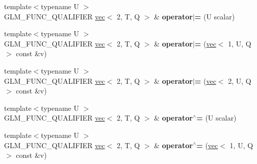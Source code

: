 \begin{DoxyCompactItemize}
\item 
\mbox{\label{structglm_1_1vec_3_012_00_01T_00_01Q_01_4_acc0ff197f7484a80cfb27a71365d9756}} 
{\footnotesize template$<$typename U $>$ }\\G\+L\+M\+\_\+\+F\+U\+N\+C\+\_\+\+Q\+U\+A\+L\+I\+F\+I\+ER \hyperlink{structglm_1_1vec}{vec}$<$ 2, T, Q $>$ \& {\bfseries operator$\vert$=} (U scalar)
\item 
\mbox{\label{structglm_1_1vec_3_012_00_01T_00_01Q_01_4_ae4060ed77226e8669a00d6511f61eab3}} 
{\footnotesize template$<$typename U $>$ }\\G\+L\+M\+\_\+\+F\+U\+N\+C\+\_\+\+Q\+U\+A\+L\+I\+F\+I\+ER \hyperlink{structglm_1_1vec}{vec}$<$ 2, T, Q $>$ \& {\bfseries operator$\vert$=} (\hyperlink{structglm_1_1vec}{vec}$<$ 1, U, Q $>$ const \&v)
\item 
\mbox{\label{structglm_1_1vec_3_012_00_01T_00_01Q_01_4_a7c1e10ca06c86243f4ad6ceb094e7bdc}} 
{\footnotesize template$<$typename U $>$ }\\G\+L\+M\+\_\+\+F\+U\+N\+C\+\_\+\+Q\+U\+A\+L\+I\+F\+I\+ER \hyperlink{structglm_1_1vec}{vec}$<$ 2, T, Q $>$ \& {\bfseries operator$\vert$=} (\hyperlink{structglm_1_1vec}{vec}$<$ 2, U, Q $>$ const \&v)
\item 
\mbox{\label{structglm_1_1vec_3_012_00_01T_00_01Q_01_4_a001454ab3038753bcf6550210eee8e59}} 
{\footnotesize template$<$typename U $>$ }\\G\+L\+M\+\_\+\+F\+U\+N\+C\+\_\+\+Q\+U\+A\+L\+I\+F\+I\+ER \hyperlink{structglm_1_1vec}{vec}$<$ 2, T, Q $>$ \& {\bfseries operator$^\wedge$=} (U scalar)
\item 
\mbox{\label{structglm_1_1vec_3_012_00_01T_00_01Q_01_4_a430b0e95cce94009cb9822a7b8a08f89}} 
{\footnotesize template$<$typename U $>$ }\\G\+L\+M\+\_\+\+F\+U\+N\+C\+\_\+\+Q\+U\+A\+L\+I\+F\+I\+ER \hyperlink{structglm_1_1vec}{vec}$<$ 2, T, Q $>$ \& {\bfseries operator$^\wedge$=} (\hyperlink{structglm_1_1vec}{vec}$<$ 1, U, Q $>$ const \&v)
\item 
\mbox{\label{structglm_1_1vec_3_012_00_01T_00_01Q_01_4_afed5270119c717c84024b98edb08e265}} 

\end{DoxyCompactItemize}
